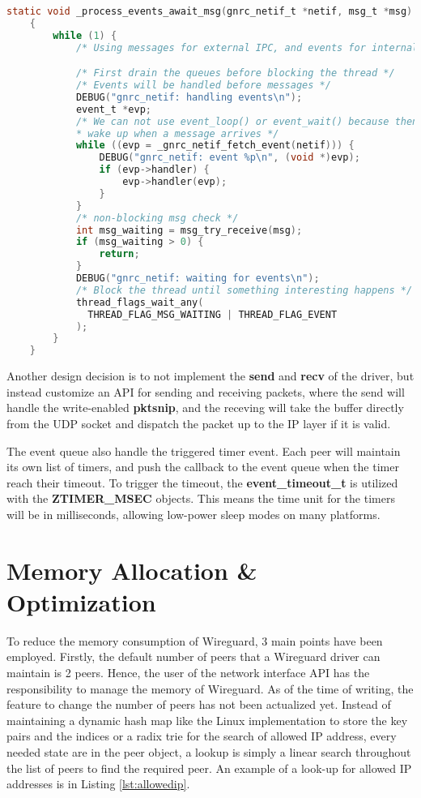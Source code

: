   \begin{lstlisting}[caption = Netif event handler,language=C, label={lst:netifev}]
    static void _process_events_await_msg(gnrc_netif_t *netif, msg_t *msg)
    {
        while (1) {
            /* Using messages for external IPC, and events for internal events */

            /* First drain the queues before blocking the thread */
            /* Events will be handled before messages */
            DEBUG("gnrc_netif: handling events\n");
            event_t *evp;
            /* We can not use event_loop() or event_wait() because then we would not
            * wake up when a message arrives */
            while ((evp = _gnrc_netif_fetch_event(netif))) {
                DEBUG("gnrc_netif: event %p\n", (void *)evp);
                if (evp->handler) {
                    evp->handler(evp);
                }
            }
            /* non-blocking msg check */
            int msg_waiting = msg_try_receive(msg);
            if (msg_waiting > 0) {
                return;
            }
            DEBUG("gnrc_netif: waiting for events\n");
            /* Block the thread until something interesting happens */
            thread_flags_wait_any(
              THREAD_FLAG_MSG_WAITING | THREAD_FLAG_EVENT
            );
        }
    }
  \end{lstlisting}

  Another design decision is to not implement the \textbf{send} and \textbf{recv} of the driver, but instead 
  customize an API for sending and receiving packets, where the send will handle the write-enabled 
  \textbf{pktsnip}, and the receving will take the buffer directly from the UDP socket and dispatch the packet 
  up to the IP layer if it is valid.

  The event queue also handle the triggered timer event. Each peer will maintain its own list 
  of timers, and push the callback to the event queue when the timer reach their timeout. 
  To trigger the timeout, the \textbf{event{\_}timeout{\_}t} is utilized with the \textbf{ZTIMER{\_}MSEC}
  objects. This means the time unit for the timers will be in milliseconds, allowing low-power
  sleep modes on many platforms.
\section{Memory Allocation \& Optimization}
  To reduce the memory consumption of Wireguard, 3 main points have been employed. Firstly, the default number
  of peers that a Wireguard driver can maintain is 2 peers. Hence, the user of the network interface
  API has the responsibility to manage the memory of Wireguard. As of the time of writing, the 
  feature to change the number of peers has not been actualized yet. Instead of maintaining
  a dynamic hash map like the Linux implementation to store the key pairs and the indices
  or a radix trie for the search of allowed IP address, 
  every needed state are in the peer object, a lookup is simply a linear search throughout the list of
  peers to find the required peer. An example of a look-up for allowed IP addresses is in Listing \ref{lst:allowedip}.

